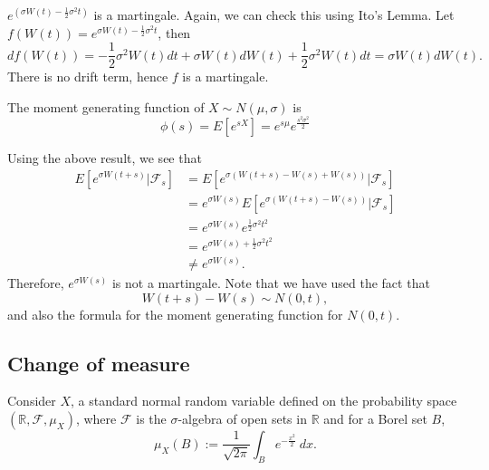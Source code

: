 \documentclass{amsart}
\theoremstyle{plain}
\numberwithin{equation}{section}
\begin{document}
$e^{\left(\sigma W(t) - \frac{1}{2}\sigma^2 t\right)}$ is a martingale.
Again, we can check this using Ito's Lemma. 
Let $f(W(t)) = e^{\sigma W(t)-\frac{1}{2}\sigma^2 t}$, then
\begin{equation}
df(W(t)) = -\frac{1}{2}\sigma^2 W(t) dt + \sigma W(t)dW(t) + \frac{1}{2}\sigma^2 W(t)dt
= \sigma W(t)dW(t).
\end{equation}
There is no drift term, hence $f$ is a martingale.

The moment generating function of $X \sim N(\mu, \sigma)$ is 
\begin{equation}
\phi(s) = E[ e^{sX} ] = e^{s\mu}e^{\frac{s^2\sigma^2}{2}}
\end{equation}

Using the above result, we see that
\begin{align*}
E[e^{\sigma W(t+s)} | \mathcal{F}_s] 
&= E[e^{\sigma (W(t+s) - W(s) + W(s))} | \mathcal{F}_s]\\
&= e^{\sigma W(s)}E[e^{\sigma (W(t+s) - W(s))}| \mathcal{F}_s]\\
&= e^{\sigma W(s)}e^{\frac{1}{2}\sigma^2 t^2}\\
&= e^{\sigma W(s) + \frac{1}{2}\sigma^2 t^2}\\
&\neq e^{\sigma W(s)}.
\end{align*}
Therefore, $e^{\sigma W(s)}$ is not a martingale. Note that 
we have used the fact that 
\begin{equation}
W(t+s) - W(s) \sim N(0, t), 
\end{equation}
and also the formula for the moment generating 
function for $N(0, t)$.

\subsection*{Change of measure}
Consider $X$, a standard normal 
random variable defined on the 
probability space $(\mathbb{R}, \mathcal{F}, \mu_X)$, where
$\mathcal{F}$ is the $\sigma$-algebra 
of open sets in $\mathbb{R}$ and
for a Borel set $B$,
\begin{equation*}
\mu_X(B) := \frac{1}{\sqrt{2 \pi} }
\int_{B} e^{-\frac{x^2}{2}} \: dx.
\end{equation*}
\end{document}
